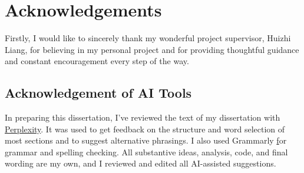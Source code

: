 \chapter*{Acknowledgements}

Firstly, I would like to sincerely thank my wonderful project supervisor, Huizhi Liang, for believing in my personal project and for providing thoughtful guidance and constant encouragement every step of the way.



\section*{Acknowledgement of AI Tools}

In preparing this dissertation, I’ve reviewed the text of my dissertation with \href{https://www.perplexity.ai}{Perplexity}. It was used to get feedback on the structure and word selection of most sections and to suggest alternative phrasings. I also used Grammarly \href{https://www.grammarly.com} for grammar and spelling checking. All substantive ideas, analysis, code, and final wording are my own, and I reviewed and edited all AI-assisted suggestions.

